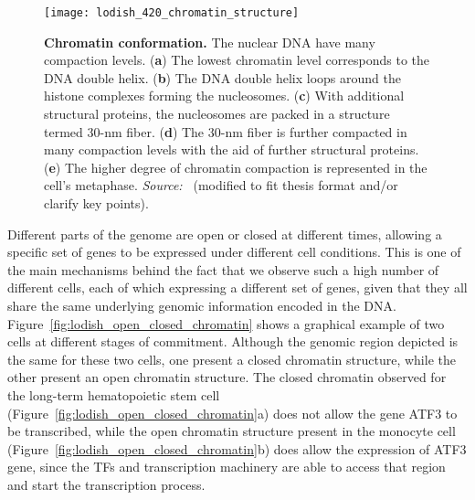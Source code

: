 \begin{figure}[h!]
\centering
\texttt{[image: lodish\_420\_chromatin\_structure]}
\caption[Chromatin conformation]{\textbf{Chromatin conformation.} The nuclear DNA have many compaction levels. (\textbf{a}) The lowest chromatin level corresponds to the DNA double helix. (\textbf{b}) The DNA double helix loops around the histone complexes forming the nucleosomes. (\textbf{c}) With additional structural proteins, the nucleosomes are packed in a structure termed $30$-nm fiber. (\textbf{d}) The $30$-nm fiber is further compacted in many compaction levels with the aid of further structural proteins. (\textbf{e}) The higher degree of chromatin compaction is represented in the cell's metaphase. \emph{Source:~\cite{lodish2007}} (modified to fit thesis format and/or clarify key points).}
\label{fig:lodish_chromatin_structure}
\end{figure}

Different parts of the genome are open or closed at different times, allowing a specific set of genes to be expressed under different cell conditions. This is one of the main mechanisms behind the fact that we observe such a high number of different cells, each of which expressing a different set of genes, given that they all share the same underlying genomic information encoded in the DNA. Figure~\ref{fig:lodish_open_closed_chromatin} shows a graphical example of two cells at different stages of commitment. Although the genomic region depicted is the same for these two cells, one present a closed chromatin structure, while the other present an open chromatin structure. The closed chromatin observed for the long-term hematopoietic stem cell (Figure~\ref{fig:lodish_open_closed_chromatin}a) does not allow the gene ATF3 to be transcribed, while the open chromatin structure present in the monocyte cell (Figure~\ref{fig:lodish_open_closed_chromatin}b) does allow the expression of ATF3 gene, since the TFs and transcription machinery are able to access that region and start the transcription process.

